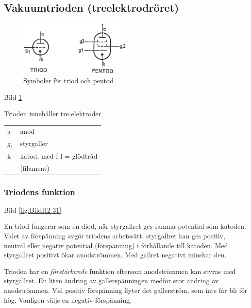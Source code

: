 \subsection{Vakuumtrioden (treelektrodröret)}

\begin{figure}[h]
\begin{center}
  \includegraphics[width=0.5\textwidth]{images/cropped_pdfs/bild_2_2-30.pdf}
  \caption{Symboler för triod och pentod}
  \label{fig:BildII2-30}
\end{center}
\end{figure}

Bild \ref{fig:BildII2-30}

Trioden innehåller tre elektroder
\begin{tabular}{ll}
a & anod \\
\(g_1\) & styrgaller \\
k & katod, med f f = glödtråd \\
  & (filament) \\
\end{tabular}

\subsubsection{Triodens funktion}

Bild \ref{fig:BildII2-31}

En triod fungerar som en diod, när styrgallret ges samma potential som katoden.
Valet av förspänning avgör triodens arbetssätt. styrgallret kan ges positiv,
neutral eller negativ potential (förspänning) i förhållande till katoden. Med
styrgallret positivt ökar anodströmmen. Med gallret negativt minskar den.

Trioden har en \emph{förstärkande} funktion eftersom anodströmmen kan styras med
styrgallret. En liten ändring av gallerspänningen medför stor ändring av
anodströmmen. Vid positiv förspänning flyter det gallerström, som inte får bli
för hög. Vanligen väljs en negativ förspänning.

